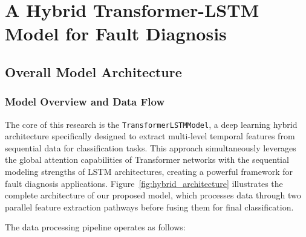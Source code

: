 \chapter{A Hybrid Transformer-LSTM Model for Fault Diagnosis}
\label{cha:hybrid_model}

\section{Overall Model Architecture}
\label{sec:hybrid_model:architecture}

\subsection{Model Overview and Data Flow}

The core of this research is the \texttt{TransformerLSTMModel}, a deep learning hybrid architecture specifically designed to extract multi-level temporal features from sequential data for classification tasks. This approach simultaneously leverages the global attention capabilities of Transformer networks with the sequential modeling strengths of LSTM architectures, creating a powerful framework for fault diagnosis applications. Figure~\ref{fig:hybrid_architecture} illustrates the complete architecture of our proposed model, which processes data through two parallel feature extraction pathways before fusing them for final classification.

The data processing pipeline operates as follows:

